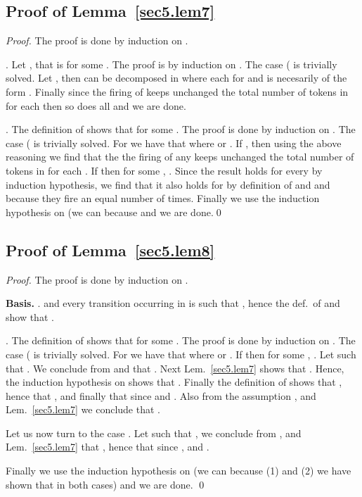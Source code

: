 \documentclass{fsttcs}
\begin{document}
\subsection{Proof of Lemma~\ref{sec5.lem7}}

\begin{proof} 
The proof is done by induction on .

 . 
Let , that is  for some .
The proof is by induction on . The case  ( is trivially
solved. Let , then  can be decomposed in 
where each  for  and
 is necesarily of the form . 
Finally since the firing of  keeps unchanged the total number of
tokens in  for each  then
so does all  and we are done.

 .   
The definition of  shows that  for some . The proof is done by
induction on . The case  ( is trivially solved. For
 we have that  where  or .  If
, then using the above reasoning we find that the the firing
of any  keeps unchanged the total number of tokens in
 for each .  If
 then  for some , .
Since the result holds for every  by induction hypothesis,
we find that it also holds for  by definition of  and
 and because they fire an equal number of times.  Finally we use
the induction hypothesis on  (we can because  and we are done.\qed
\end{proof}


\subsection{Proof of Lemma~\ref{sec5.lem8}}

\begin{proof} The proof is done by induction on . 
\medskip

\noindent
{\bf Basis.} .
 and every transition  occurring in  is such
that , hence the def.\ of  and  show that .

\medskip

 .
The definition of  shows that  for some . The proof is done by
induction on . The case  ( is trivially solved. For
 we have that  where  or .  If
 then  for some , .  Let
 such that
.
We conclude from  and
 that .  Next Lem.~\ref{sec5.lem7} shows that .  Hence, the induction
hypothesis on  shows that . Finally the definition of  shows that ,
hence that , and finally that
 since  and
.  
Also from the assumption ,
 and Lem.~\ref{sec5.lem7} we conclude that .

Let us now turn to the case .  Let  such that
, we conclude from ,  and Lem.~\ref{sec5.lem7} that
, hence that
 since ,
 and . 

Finally we use the induction hypothesis on  (we can because
(1)  and (2) we have shown that  in both cases) and we are done.
\qed
\end{proof}
\end{document}

